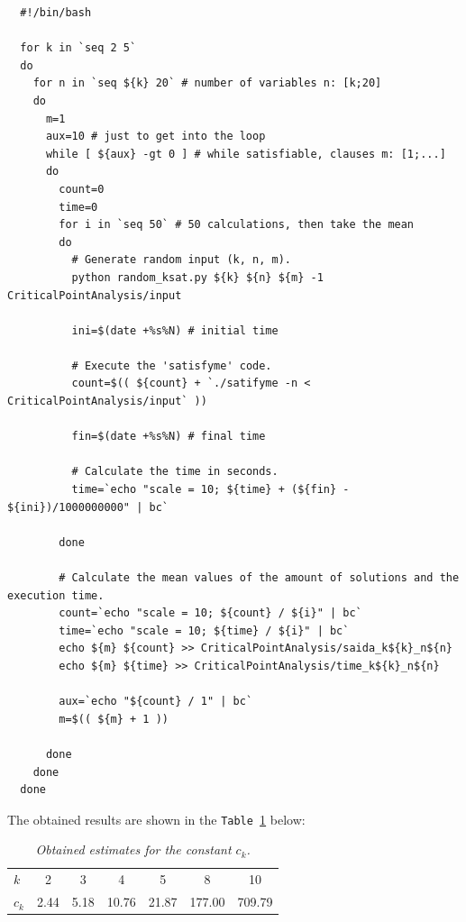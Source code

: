 \documentclass[12pt]{article}
\begin{document}
{\footnotesize
\begin{verbatim}
  #!/bin/bash

  for k in `seq 2 5`
  do
    for n in `seq ${k} 20` # number of variables n: [k;20]
    do
      m=1
      aux=10 # just to get into the loop
      while [ ${aux} -gt 0 ] # while satisfiable, clauses m: [1;...]
      do
        count=0
        time=0
        for i in `seq 50` # 50 calculations, then take the mean
        do
          # Generate random input (k, n, m).
          python random_ksat.py ${k} ${n} ${m} -1 CriticalPointAnalysis/input

          ini=$(date +%s%N) # initial time

          # Execute the 'satisfyme' code.
          count=$(( ${count} + `./satifyme -n < CriticalPointAnalysis/input` ))

          fin=$(date +%s%N) # final time

          # Calculate the time in seconds.
          time=`echo "scale = 10; ${time} + (${fin} - ${ini})/1000000000" | bc`

        done

        # Calculate the mean values of the amount of solutions and the execution time.
        count=`echo "scale = 10; ${count} / ${i}" | bc`
        time=`echo "scale = 10; ${time} / ${i}" | bc`
        echo ${m} ${count} >> CriticalPointAnalysis/saida_k${k}_n${n}
        echo ${m} ${time} >> CriticalPointAnalysis/time_k${k}_n${n}

        aux=`echo "${count} / 1" | bc`
        m=$(( ${m} + 1 ))

      done
    done
  done
\end{verbatim}
}

\linespread{1.5}

The obtained results are shown in the \texttt{Table \ref{tab:result}} below:
\\[-5pt]

\begin{table}[h]
  \begin{center}
    \begin{tabular}{l c c c c c c}
      \hline
      $k$ & 2 & 3 & 4 & 5 & 8 & 10 \\
      $c_k$ & 2.44 & 5.18 & 10.76 & 21.87 & 177.00 & 709.79 \\
      \hline
    \end{tabular}
    \caption{\small{\emph{Obtained estimates for the constant $c_k$.}}}
    \label{tab:result}
  \end{center}
\end{table}
\end{document}
